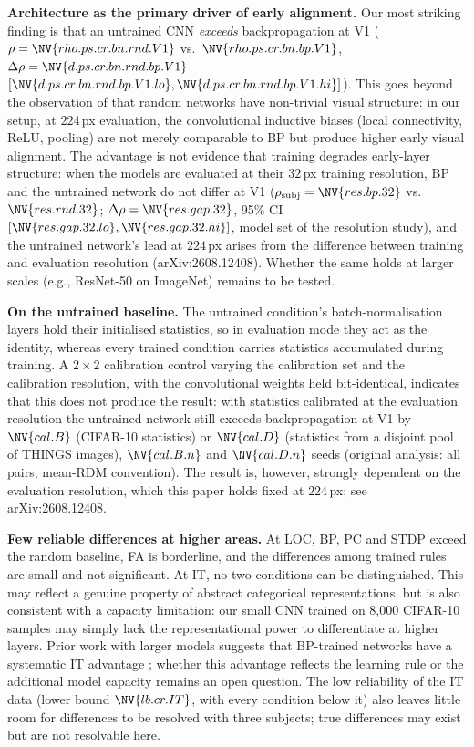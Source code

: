 \documentclass[10pt,twocolumn]{article}
\newcommand{\newid}{arXiv:2608.12408}
\newcommand{\rs}[2]{\NV{rho.ps.cr.bn.#1.#2}}
\newcommand{\dps}[3]{\NV{d.ps.cr.bn.#1.#2.#3}}
\newcommand{\dpsci}[3]{[\NV{d.ps.cr.bn.#1.#2.#3.lo},\NV{d.ps.cr.bn.#1.#2.#3.hi}]}
\newcommand{\lb}[1]{\NV{lb.cr.#1}}
\begin{document}
\textbf{Architecture as the primary driver of early alignment.} Our most striking finding is that an untrained CNN \emph{exceeds} backpropagation at V1 ($\rho = \rs{rnd}{V1}$ vs.\ $\rs{bp}{V1}$, $\Delta\rho = \dps{rnd}{bp}{V1}$ $\dpsci{rnd}{bp}{V1}$). This goes beyond the observation of \citet{saxe2011} that random networks have non-trivial visual structure: in our setup, at $224$\,px evaluation, the convolutional inductive biases (local connectivity, ReLU, pooling) are not merely comparable to BP but produce higher early visual alignment. The advantage is not evidence that training degrades early-layer structure: when the models are evaluated at their $32$\,px training resolution, BP and the untrained network do not differ at V1 ($\rho_{\text{subj}} = \NV{res.bp.32}$ vs.\ $\NV{res.rnd.32}$; $\Delta\rho = \NV{res.gap.32}$, 95\% CI $[\NV{res.gap.32.lo},\NV{res.gap.32.hi}]$, model set of the resolution study), and the untrained network's lead at $224$\,px arises from the difference between training and evaluation resolution (\newid). Whether the same holds at larger scales (e.g., ResNet-50 on ImageNet) remains to be tested.

\textbf{On the untrained baseline.} The untrained condition's batch-normalisation layers hold their initialised statistics, so in evaluation mode they act as the identity, whereas every trained condition carries statistics accumulated during training. A $2\times2$ calibration control varying the calibration set and the calibration resolution, with the convolutional weights held bit-identical, indicates that this does not produce the result: with statistics calibrated at the evaluation resolution the untrained network still exceeds backpropagation at V1 by $\NV{cal.B}$ (CIFAR-10 statistics) or $\NV{cal.D}$ (statistics from a disjoint pool of THINGS images), $\NV{cal.B.n}$ and $\NV{cal.D.n}$ seeds (original analysis: all pairs, mean-RDM convention). The result is, however, strongly dependent on the evaluation resolution, which this paper holds fixed at $224$\,px; see \newid.

\textbf{Few reliable differences at higher areas.} At LOC, BP, PC and STDP exceed the random baseline, FA is borderline, and the differences among trained rules are small and not significant. At IT, no two conditions can be distinguished. This may reflect a genuine property of abstract categorical representations, but is also consistent with a capacity limitation: our small CNN trained on 8,000 CIFAR-10 samples may simply lack the representational power to differentiate at higher layers. Prior work with larger models suggests that BP-trained networks have a systematic IT advantage \citep{schrimpf2020}; whether this advantage reflects the learning rule or the additional model capacity remains an open question. The low reliability of the IT data (lower bound $\lb{IT}$, with every condition below it) also leaves little room for differences to be resolved with three subjects; true differences may exist but are not resolvable here.
\end{document}
